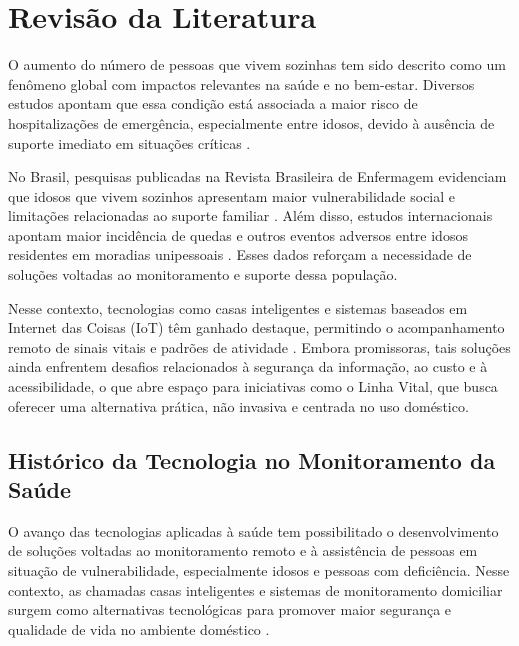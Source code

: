 \chapter{Revisão da Literatura}

O aumento do número de pessoas que vivem sozinhas tem sido descrito como um fenômeno global com impactos relevantes na saúde e no bem-estar. Diversos estudos apontam que essa condição está associada a maior risco de hospitalizações de emergência, especialmente entre idosos, devido à ausência de suporte imediato em situações críticas \cite{pimouguet2017}.

No Brasil, pesquisas publicadas na Revista Brasileira de Enfermagem evidenciam que idosos que vivem sozinhos apresentam maior vulnerabilidade social e limitações relacionadas ao suporte familiar \cite{perseguino2017}. Além disso, estudos internacionais apontam maior incidência de quedas e outros eventos adversos entre idosos residentes em moradias unipessoais \cite{nakamura2017}. Esses dados reforçam a necessidade de soluções voltadas ao monitoramento e suporte dessa população.

Nesse contexto, tecnologias como casas inteligentes e sistemas baseados em Internet das Coisas (IoT) têm ganhado destaque, permitindo o acompanhamento remoto de sinais vitais e padrões de atividade \cite{smarthomehealth2019,predictivehealthcare2020}. Embora promissoras, tais soluções ainda enfrentem desafios relacionados à segurança da informação, ao custo e à acessibilidade, o que abre espaço para iniciativas como o Linha Vital, que busca oferecer uma alternativa prática, não invasiva e centrada no uso doméstico.

\section{Histórico da Tecnologia no Monitoramento da Saúde}

O avanço das tecnologias aplicadas à saúde tem possibilitado o desenvolvimento de soluções voltadas ao monitoramento remoto e à assistência de pessoas em situação de vulnerabilidade, especialmente idosos e pessoas com deficiência. Nesse contexto, as chamadas casas inteligentes e sistemas de monitoramento domiciliar surgem como alternativas tecnológicas para promover maior segurança e qualidade de vida no ambiente doméstico \cite{smartliving2018,ambientassistedliving2016}.

